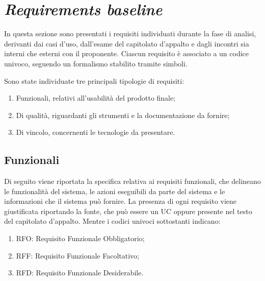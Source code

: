 \section{\textit{Requirements baseline}}

In questa sezione sono presentati i requisiti individuati durante la fase di analisi, derivanti dai casi d'uso, dall'esame del capitolato d'appalto e dagli incontri
sia interni che esterni con il proponente. Ciascun requisito è associato a un codice univoco, seguendo un formalismo stabilito tramite simboli.

Sono state individuate tre principali tipologie di requisiti:
\begin{enumerate}
	\item Funzionali, relativi all'usabilità del prodotto finale;
	\item Di qualità, riguardanti gli strumenti e la documentazione da fornire;
	\item Di vincolo, concernenti le tecnologie da presentare.
\end{enumerate}

\subsection{Funzionali}

Di seguito viene riportata la specifica relativa ai requisiti funzionali, che delineano le funzionalità del sistema, le azioni eseguibili
da parte del sistema e le informazioni che il sistema può fornire. La presenza di ogni requisito viene giustificata riportando la fonte, che può essere un UC oppure presente
nel testo del capitolato d'appalto. Mentre i codici univoci sottostanti indicano:
\begin{enumerate}
	\item RFO: Requisito Funzionale Obbligatorio;
	\item RFF: Requisito Funzionale Facoltativo;
	\item RFD: Requisito Funzionale Desiderabile.
\end{enumerate}


